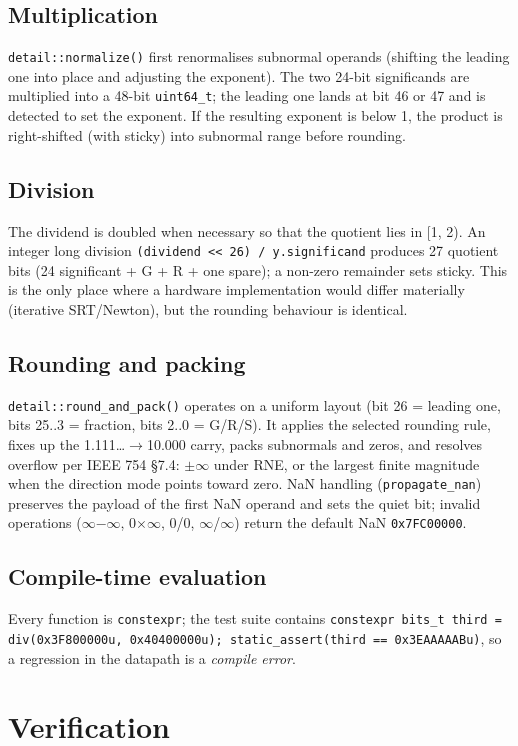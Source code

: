 \documentclass[11pt,a4paper]{article}
\begin{document}
\subsection{Multiplication}
\texttt{detail::normalize()} first renormalises subnormal operands (shifting the leading one into place and adjusting the exponent). The two 24-bit significands are multiplied into a 48-bit \texttt{uint64\_t}; the leading one lands at bit 46 or 47 and is detected to set the exponent. If the resulting exponent is below 1, the product is right-shifted (with sticky) into subnormal range before rounding.

\subsection{Division}
The dividend is doubled when necessary so that the quotient lies in [1, 2). An integer long division \texttt{(dividend << 26) / y.significand} produces 27 quotient bits (24 significant + G + R + one spare); a non-zero remainder sets sticky. This is the only place where a hardware implementation would differ materially (iterative SRT/Newton), but the rounding behaviour is identical.

\subsection{Rounding and packing}
\texttt{detail::round\_and\_pack()} operates on a uniform layout (bit 26 = leading one, bits 25..3 = fraction, bits 2..0 = G/R/S). It applies the selected rounding rule, fixes up the 1.111\dots{}$\rightarrow$10.000 carry, packs subnormals and zeros, and resolves overflow per IEEE 754 §7.4: $\pm$$\infty$ under RNE, or the largest finite magnitude when the direction mode points toward zero. NaN handling (\texttt{propagate\_nan}) preserves the payload of the first NaN operand and sets the quiet bit; invalid operations ($\infty$$-$$\infty$, 0$\times$$\infty$, 0/0, $\infty$/$\infty$) return the default NaN \texttt{0x7FC00000}.

\subsection{Compile-time evaluation}
Every function is \texttt{constexpr}; the test suite contains \texttt{constexpr bits\_t third = div(0x3F800000u, 0x40400000u); static\_assert(third == 0x3EAAAAABu)}, so a regression in the datapath is a \emph{compile error}.

\section{Verification}
\end{document}
